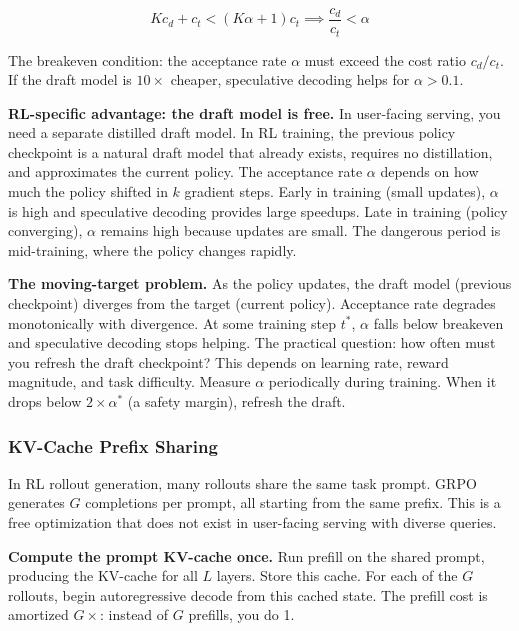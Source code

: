 $$K c_d + c_t < (K\alpha + 1) c_t \implies \frac{c_d}{c_t} < \alpha$$

The breakeven condition: the acceptance rate $\alpha$ must exceed the cost ratio $c_d / c_t$. If the draft model is $10\times$ cheaper, speculative decoding helps for $\alpha > 0.1$.

\textbf{RL-specific advantage: the draft model is free.} In user-facing serving, you need a separate distilled draft model. In RL training, the previous policy checkpoint is a natural draft model that already exists, requires no distillation, and approximates the current policy. The acceptance rate $\alpha$ depends on how much the policy shifted in $k$ gradient steps. Early in training (small updates), $\alpha$ is high and speculative decoding provides large speedups. Late in training (policy converging), $\alpha$ remains high because updates are small. The dangerous period is mid-training, where the policy changes rapidly.

\textbf{The moving-target problem.} As the policy updates, the draft model (previous checkpoint) diverges from the target (current policy). Acceptance rate degrades monotonically with divergence. At some training step $t^*$, $\alpha$ falls below breakeven and speculative decoding stops helping. The practical question: how often must you refresh the draft checkpoint? This depends on learning rate, reward magnitude, and task difficulty. Measure $\alpha$ periodically during training. When it drops below $2 \times \alpha^*$ (a safety margin), refresh the draft.

\subsubsection*{KV-Cache Prefix Sharing}

In RL rollout generation, many rollouts share the same task prompt. GRPO generates $G$ completions per prompt, all starting from the same prefix. This is a free optimization that does not exist in user-facing serving with diverse queries.

\textbf{Compute the prompt KV-cache once.} Run prefill on the shared prompt, producing the KV-cache for all $L$ layers. Store this cache. For each of the $G$ rollouts, begin autoregressive decode from this cached state. The prefill cost is amortized $G\times$: instead of $G$ prefills, you do 1.

